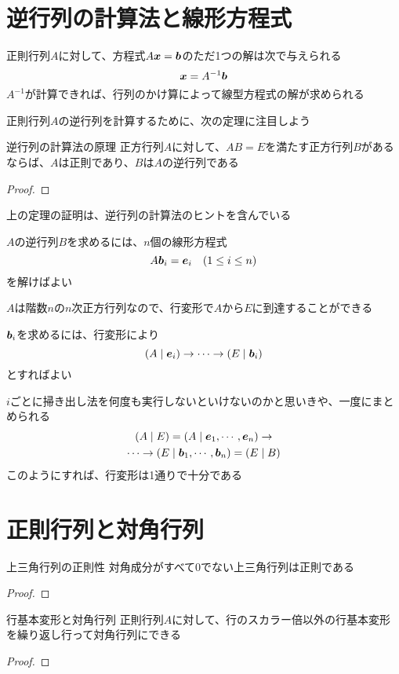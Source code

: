 \documentclass[../../../topic_linear-algebra]{subfiles}
\begin{document}
\sectionline
\section{逆行列の計算法と線形方程式}

正則行列$A$に対して、方程式$A\vb*{x} = \vb*{b}$のただ1つの解は次で与えられる
\begin{equation*}
  \vb*{x} = A^{-1} \vb*{b}
\end{equation*}
$A^{-1}$が計算できれば、行列のかけ算によって線型方程式の解が求められる

\sectionline

正則行列$A$の逆行列を計算するために、次の定理に注目しよう

\begin{theorem}{逆行列の計算法の原理}
  正方行列$A$に対して、$AB=E$を満たす正方行列$B$があるならば、$A$は正則であり、$B$は$A$の逆行列である
\end{theorem}

\begin{proof}
\end{proof}

上の定理の証明は、逆行列の計算法のヒントを含んでいる

$A$の逆行列$B$を求めるには、$n$個の線形方程式
\begin{equation*}
  A\vb*{b}_i = \vb*{e}_i \quad ( 1    \leq i \leq n )
\end{equation*}
を解けばよい

\br

$A$は階数$n$の$n$次正方行列なので、行変形で$A$から$E$に到達することができる

\br

$\vb*{b}_i$を求めるには、行変形により
\begin{equation*}
  (A \mid \vb*{e}_i) \rightarrow \cdots \rightarrow (E \mid \vb*{b}_i)
\end{equation*}
とすればよい

\br

$i$ごとに掃き出し法を何度も実行しないといけないのかと思いきや、一度にまとめられる
\begin{gather*}
  (A \mid E) = (A \mid \vb*{e}_1, \cdots , \vb*{e}_n) \rightarrow \\ \cdots \rightarrow (E \mid \vb*{b}_1 , \cdots , \vb*{b}_n) = (E \mid B)
\end{gather*}
このようにすれば、行変形は1通りで十分である

\sectionline
\section{正則行列と対角行列}

\begin{theorem}{上三角行列の正則性}
  対角成分がすべて0でない上三角行列は正則である
\end{theorem}

\begin{proof}
\end{proof}

\sectionline

\begin{theorem}{行基本変形と対角行列}
  正則行列$A$に対して、行のスカラー倍以外の行基本変形を繰り返し行って対角行列にできる
\end{theorem}

\begin{proof}
\end{proof}
\end{document}

